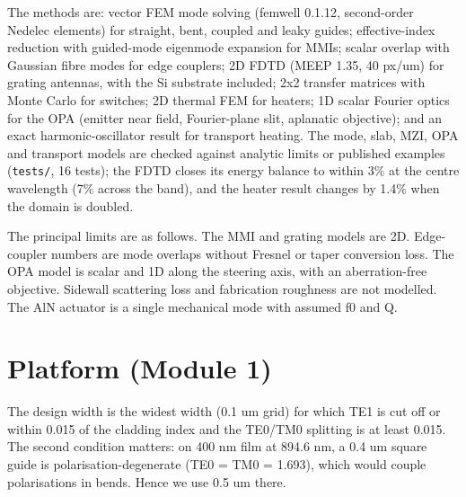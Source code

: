 The methods are: vector FEM mode solving (femwell 0.1.12, second-order
Nedelec elements) for straight, bent, coupled and leaky guides;
effective-index reduction with guided-mode eigenmode expansion for MMIs;
scalar overlap with Gaussian fibre modes for edge couplers; 2D FDTD
(MEEP 1.35, 40 px/um) for grating antennas, with the Si substrate
included; 2x2 transfer matrices with Monte Carlo for switches; 2D
thermal FEM for heaters; 1D scalar Fourier optics for the OPA (emitter
near field, Fourier-plane slit, aplanatic objective); and an exact
harmonic-oscillator result for transport heating. The mode, slab, MZI,
OPA and transport models are checked against analytic limits or
published examples (\texttt{tests/}, 16 tests); the FDTD closes its
energy balance to within 3\% at the centre wavelength (7\% across the
band), and the heater result changes by 1.4\% when the domain is
doubled.

The principal limits are as follows. The MMI and grating models are 2D.
Edge-coupler numbers are mode overlaps without Fresnel or taper
conversion loss. The OPA model is scalar and 1D along the steering axis,
with an aberration-free objective. Sidewall scattering loss and
fabrication roughness are not modelled. The AlN actuator is a single
mechanical mode with assumed f0 and Q.

\hypertarget{3-platform-module-1}{%
\section{Platform (Module 1)}\label{findings-3-platform-module-1}}

The design width is the widest width (0.1 um grid) for which TE1 is cut
off or within 0.015 of the cladding index and the TE0/TM0 splitting is
at least 0.015. The second condition matters: on 400 nm film at 894.6
nm, a 0.4 um square guide is polarisation-degenerate (TE0 = TM0 =
1.693), which would couple polarisations in bends. Hence we use 0.5 um
there.

